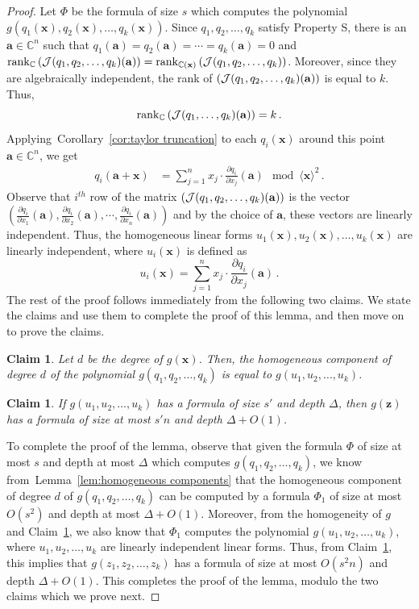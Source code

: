 \documentclass[10pt,a4paper]{article}
\newtheorem{claim}[theorem]{Claim}
\theoremstyle{definition}
\newcommand{\F}{\mathbb C}
\newcommand{\va}{\mathbf a}
\newcommand{\vx}{\mathbf x}
\newcommand{\vz}{\mathbf z}
\DeclareMathOperator{\rank}{rank}
\begin{document}
\begin{proof}
Let $\Phi$ be the formula of size $s$ which computes the polynomial $g\left(q_1(\vx), q_2(\vx), \ldots, q_k(\vx)\right)$. Since $q_1, q_2, \ldots, q_k$ satisfy Property S, there is an $\va \in \F^n$ such that $q_1(\va) = q_2(\va) = \cdots = q_k(\va) = 0$ and ${\rank}_{\F}\left({\cal J}(q_1, q_2, \ldots, q_k)(\va)\right) = \rank_{\F(\vx)}\left({\cal J}(q_1, q_2, \ldots, q_k)\right)$. Moreover, since they are algebraically independent, the rank of $\left({\cal J}(q_1, q_2, \ldots, q_k)(\va)\right)$ is equal to $k$. Thus, $${\rank}_{\F}\left({\cal J}(q_1, \ldots, q_k)(\va)\right) = k \, .$$
Applying~Corollary~\ref{cor:taylor truncation} to each $q_i(\vx)$ around this point $\va \in \F^n$, we get  
\begin{align*}
q_i(\va + \vx) &= \sum_{j = 1}^n x_j\cdot \frac{\partial q_i}{\partial x_j} (\va)  \mod \langle \vx \rangle^2 \, .
\end{align*}
Observe that $i^{th}$ row of the matrix $\left({\cal J}(q_1, q_2, \ldots, q_k)(\va)\right)$ is the vector $\left(\frac{\partial q_i}{\partial x_1} (\va), \frac{\partial q_i}{\partial x_2} (\va), \cdots, \frac{\partial q_i}{\partial x_n} (\va) \right)$ and by the choice of $\va$, these vectors  are linearly independent. Thus, the homogeneous linear forms $u_1(\vx), u_2(\vx), \ldots, u_k(\vx)$ are linearly independent, where $u_i(\vx)$ is defined as 
\[
u_i(\vx) = \sum_{j = 1}^n x_j\cdot \frac{\partial q_i}{\partial x_j} (\va)\, .
\]
The rest of the proof follows immediately from the following two claims. We state the claims and use them to complete the proof of this lemma, and then  move on to prove the claims. 
\begin{claim}\label{claim:using homogeneity of g}
Let $d$ be the degree of $g(\vx)$. Then, the homogeneous component of degree $d$ of the polynomial $g(q_1, q_2, \ldots, q_k)$ is equal to $g(u_1, u_2, \ldots, u_k)$. 
\end{claim}

\begin{claim}\label{claim:invertible linear transformation}
If $g(u_1, u_2, \ldots, u_k)$ has a formula of size $s'$ and depth $\Delta$, then $g(\vz)$ has a formula of size at most $s'n$ and depth $\Delta+O(1)$. 
\end{claim}
To complete the proof of the lemma, observe that given the formula $\Phi$ of size at most $s$ and depth at most $\Delta$ which computes $g(q_1, q_2, \ldots, q_k)$, we know from~Lemma~\ref{lem:homogeneous components} that the homogeneous component of degree $d$ of  $g(q_1, q_2, \ldots, q_k)$ can be computed by a formula $\Phi_1$ of size at most $O(s^2)$ and depth at most $\Delta+O(1)$. Moreover, from the homogeneity of $g$ and Claim~\ref{claim:using homogeneity of g}, we also know that $\Phi_1$ computes the polynomial $g(u_1, u_2, \ldots, u_k)$, where $u_1, u_2, \ldots, u_k$ are linearly independent linear forms. Thus, from Claim~\ref{claim:invertible linear transformation}, this implies that $g(z_1, z_2, \ldots, z_k)$ has a formula of size at most $O(s^2n)$ and depth $\Delta+O(1)$. This completes the proof of the lemma, modulo the two claims which we prove next. %
\end{proof}
\end{document}
